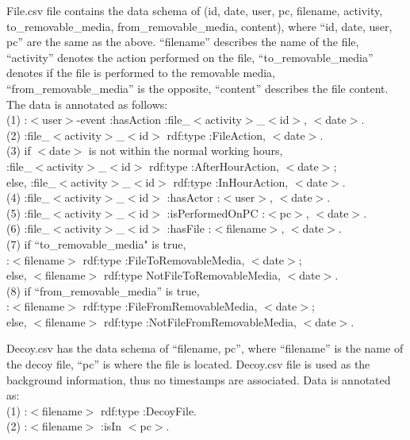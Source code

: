 File.csv file contains the data schema of (id, date, user, pc, filename, activity, to\_removable\_media, from\_removable\_media, content), where ``id, date, user, pc'' are the same as the above.
``filename'' describes the name of the file, ``activity'' denotes the action performed on the file, ``to\_removable\_media'' denotes if the file is performed to the removable media, ``from\_removable\_media'' is the opposite, ``content'' describes the file content. 
The data is annotated as follows: \\
(1) :$<$user$>$-event :hasAction :file\_$<$activity$>$\_$<$id$>$, $<$date$>$. \\
(2) :file\_$<$activity$>$\_$<$id$>$ rdf:type :FileAction, $<$date$>$. \\
(3) if $<$date$>$ is not within the normal working hours, \\
:file\_$<$activity$>$\_$<$id$>$ rdf:type :AfterHourAction, $<$date$>$;\\
else, :file\_$<$activity$>$\_$<$id$>$ rdf:type :InHourAction, $<$date$>$.\\ 
(4) :file\_$<$activity$>$\_$<$id$>$ :hasActor :$<$user$>$, $<$date$>$. \\
(5) :file\_$<$activity$>$\_$<$id$>$ :isPerformedOnPC :$<$pc$>$, $<$date$>$. \\
(6) :file\_$<$activity$>$\_$<$id$>$ :hasFile :$<$filename$>$, $<$date$>$.\\
(7) if ``to\_removable\_media" is true, \\
:$<$filename$>$ rdf:type :FileToRemovableMedia, $<$date$>$;\\
else, $<$filename$>$ rdf:type NotFileToRemovableMedia, $<$date$>$.\\ 
(8) if ``from\_removable\_media'' is true,\\
:$<$filename$>$ rdf:type :FileFromRemovableMedia, $<$date$>$;\\
else, $<$filename$>$ rdf:type :NotFileFromRemovableMedia, $<$date$>$. 

Decoy.csv has the data schema of ``filename, pc'', where ``filename'' is the name of the decoy file, ``pc'' is where the file is located.
Decoy.csv file is used as the background information, thus no timestamps are associated. 
Data is annotated as: \\
(1) :$<$filename$>$ rdf:type :DecoyFile. \\
(2) :$<$filename$>$ :isIn $<$pc$>$. 

